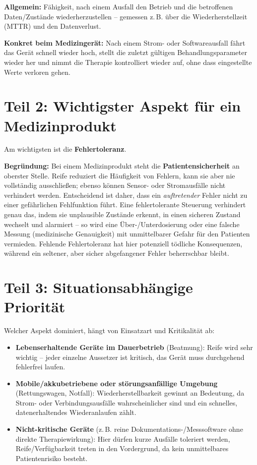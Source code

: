 \documentclass[
	fontsize=12pt,          %
	paper=a4,               %
	numbers=noenddot,       %
	listof=totoc,           %
	listof=entryprefix,     %
	listof=nochaptergap,    %
	bibliography=totoc,     %
	parskip=half,           %
	openany                 %
]{scrbook}
\begin{document}
\textbf{Allgemein:} Fähigkeit, nach einem Ausfall den Betrieb und die
betroffenen Daten/Zustände wiederherzustellen -- gemessen z.\,B. über die
Wiederherstellzeit (MTTR) und den Datenverlust.

\textbf{Konkret beim Medizingerät:} Nach einem Strom- oder Softwareausfall
fährt das Gerät schnell wieder hoch, stellt die zuletzt gültigen
Behandlungsparameter wieder her und nimmt die Therapie kontrolliert wieder auf,
ohne dass eingestellte Werte verloren gehen.

\section*{Teil 2: Wichtigster Aspekt für ein Medizinprodukt}

Am wichtigsten ist die \textbf{Fehlertoleranz}.

\textbf{Begründung:} Bei einem Medizinprodukt steht die \textbf{Patienten\-sicherheit}
an oberster Stelle.
Reife reduziert die Häufigkeit von Fehlern, kann sie aber nie vollständig
ausschließen; ebenso können Sensor- oder Stromausfälle nicht verhindert werden.
Entscheidend ist daher, dass ein \emph{auftretender} Fehler nicht zu einer
gefährlichen Fehlfunktion führt.
Eine fehlertolerante Steuerung verhindert genau das, indem sie unplausible
Zustände erkennt, in einen sicheren Zustand wechselt und alarmiert -- so wird
eine Über-/Unterdosierung oder eine falsche Messung (medizinische Genauigkeit)
mit unmittelbarer Gefahr für den Patienten vermieden.
Fehlende Fehlertoleranz hat hier potenziell tödliche Konsequenzen, während ein
seltener, aber sicher abgefangener Fehler beherrschbar bleibt.

\section*{Teil 3: Situationsabhängige Priorität}

Welcher Aspekt dominiert, hängt von Einsatzart und Kritikalität ab:

\begin{itemize}
	\item \textbf{Lebenserhaltende Geräte im Dauerbetrieb} (Beatmung): Reife wird
	      sehr wichtig -- jeder einzelne Aussetzer ist kritisch, das Gerät muss
	      durchgehend fehlerfrei laufen.
	\item \textbf{Mobile/akkubetriebene oder störungsanfällige Umgebung}
	      (Rettungswagen, Notfall): Wiederherstellbarkeit gewinnt an Bedeutung,
	      da Strom- oder Verbindungsausfälle wahrscheinlicher sind und ein
	      schnelles, datenerhaltendes Wiederanlaufen zählt.
	\item \textbf{Nicht-kritische Geräte} (z.\,B. reine Dokumentations-/Mess\-software
	      ohne direkte Therapiewirkung): Hier dürfen kurze Ausfälle toleriert
	      werden, Reife/Verfügbarkeit treten in den Vordergrund, da kein
	      unmittelbares Patientenrisiko besteht.
\end{itemize}
\end{document}
